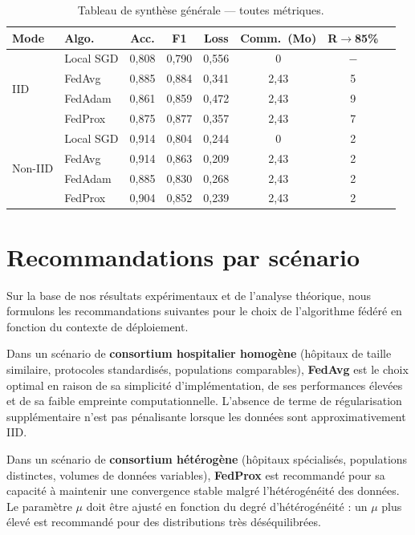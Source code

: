\documentclass[12pt,a4paper]{report}
\begin{document}
\begin{table}[H]
\centering
\caption{Tableau de synth\`{e}se g\'{e}n\'{e}rale --- toutes m\'{e}triques.}
\label{tab:master}
\small
\begin{tabular}{llcccccc}
\toprule
\textbf{Mode} & \textbf{Algo.} & \textbf{Acc.} & \textbf{F1} & \textbf{Loss} & \textbf{Comm.\ (Mo)} & \textbf{R$\to$85\%} \\
\midrule
\multirow{4}{*}{IID}
& Local SGD & 0,808 & 0,790 & 0,556 & 0 & $-$ \\
& FedAvg    & 0,885 & 0,884 & 0,341 & 2,43 & 5 \\
& FedAdam   & 0,861 & 0,859 & 0,472 & 2,43 & 9 \\
& FedProx   & 0,875 & 0,877 & 0,357 & 2,43 & 7 \\
\midrule
\multirow{4}{*}{Non-IID}
& Local SGD & 0,914 & 0,804 & 0,244 & 0 & 2 \\
& FedAvg    & 0,914 & 0,863 & 0,209 & 2,43 & 2 \\
& FedAdam   & 0,885 & 0,830 & 0,268 & 2,43 & 2 \\
& FedProx   & 0,904 & 0,852 & 0,239 & 2,43 & 2 \\
\bottomrule
\end{tabular}
\end{table}

\section{Recommandations par sc\'{e}nario}

Sur la base de nos r\'{e}sultats exp\'{e}rimentaux et de l'analyse th\'{e}orique, nous formulons les recommandations suivantes pour le choix de l'algorithme f\'{e}d\'{e}r\'{e} en fonction du contexte de d\'{e}ploiement.

Dans un sc\'{e}nario de \textbf{consortium hospitalier homog\`{e}ne} (h\^{o}pitaux de taille similaire, protocoles standardis\'{e}s, populations comparables), \textbf{FedAvg} est le choix optimal en raison de sa simplicit\'{e} d'impl\'{e}mentation, de ses performances \'{e}lev\'{e}es et de sa faible empreinte computationnelle. L'absence de terme de r\'{e}gularisation suppl\'{e}mentaire n'est pas p\'{e}nalisante lorsque les donn\'{e}es sont approximativement IID.

Dans un sc\'{e}nario de \textbf{consortium h\'{e}t\'{e}rog\`{e}ne} (h\^{o}pitaux sp\'{e}cialis\'{e}s, populations distinctes, volumes de donn\'{e}es variables), \textbf{FedProx} est recommand\'{e} pour sa capacit\'{e} \`{a} maintenir une convergence stable malgr\'{e} l'h\'{e}t\'{e}rog\'{e}n\'{e}it\'{e} des donn\'{e}es. Le param\`{e}tre $\mu$ doit \^{e}tre ajust\'{e} en fonction du degr\'{e} d'h\'{e}t\'{e}rog\'{e}n\'{e}it\'{e} : un $\mu$ plus \'{e}lev\'{e} est recommand\'{e} pour des distributions tr\`{e}s d\'{e}s\'{e}quilibr\'{e}es.
\end{document}
